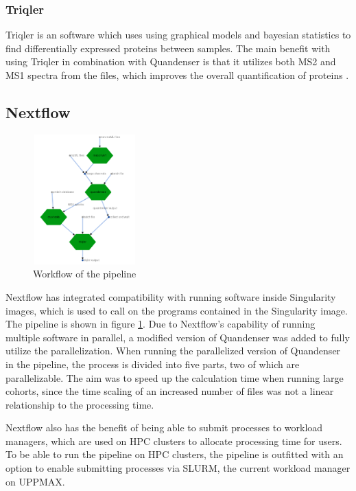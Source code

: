 \subsubsection{Triqler}
Triqler is an software which uses using graphical models and bayesian statistics to find differentially expressed proteins between samples. The main benefit with using Triqler in combination with Quandenser is that it utilizes both MS2 and MS1 spectra from the files, which improves the overall quantification of proteins \cite{triqler}.

\subsection{Nextflow}

\begin{figure}
  \centering
  \includegraphics[width=4cm, height=5cm]{pictures/workflow.png}
  \caption{Workflow of the pipeline}
  \label{fig:workflow}
\end{figure}

Nextflow has integrated compatibility with running software inside Singularity images, which is used to call on the programs contained in the Singularity image. The pipeline is shown in figure \ref{fig:workflow}. Due to Nextflow's capability of running multiple software in parallel, a modified version of Quandenser was added to fully utilize the parallelization. When running the parallelized version of Quandenser in the pipeline, the process is divided into five parts, two of which are parallelizable. The aim was to speed up the calculation time when running large cohorts, since the time scaling of an increased number of files was not a linear relationship to the processing time.

Nextflow also has the benefit of being able to submit processes to workload managers, which are used on HPC clusters to allocate processing time for users. To be able to run the pipeline on HPC clusters, the pipeline is outfitted with an option to enable submitting processes via SLURM, the current workload manager on UPPMAX.


